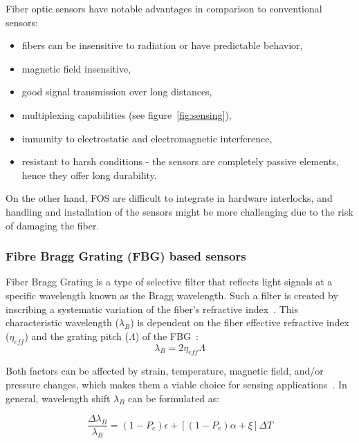 Fiber optic sensors have notable advantages in comparison to conventional sensors:

\begin{itemize}
    \item fibers can be insensitive to radiation or have predictable behavior,
    \item magnetic field insensitive,
    \item good signal transmission over long distances,
    \item multiplexing capabilities (see figure~\ref{fig:sensing}),
    \item immunity to electrostatic and electromagnetic interference,
    \item resistant to harsh conditions - the sensors are completely passive elements, hence they offer long durability.
\end{itemize}

On the other hand, \gls{FOS} are difficult to integrate in hardware interlocks, and handling and installation of the sensors might be more challenging due to the risk of damaging the fiber.




\subsubsection{Fibre Bragg Grating (FBG) based sensors}
\label{fbg}
Fiber Bragg Grating is a type of selective filter that reflects light signals at a specific wavelength known as the Bragg wavelength. Such a filter is created by inscribing a systematic variation of the fiber's refractive index~\cite{fbg_overview}. This characteristic wavelength ($\lambda_{B}$) is dependent on the fiber effective refractive index ($\eta_{eff}$) and the grating pitch ($\Lambda$) of the \gls{FBG}~\cite{Othonos2000FiberBG}:
\begin{equation}
    \lambda_{B} = 2 \eta_{eff} \Lambda
\end{equation}

Both factors can be affected by strain, temperature, magnetic field, and/or pressure changes, which makes them a viable choice for sensing applications~\cite{Yun-Jiang_Rao_1997}. In general, wavelength shift $\lambda_{B}$ can be formulated as:

\begin{equation}
    \frac{\Delta\lambda_{B}}{\lambda_{B}}=(1-P_{e}) \epsilon + \left [(1-P_{e}) \alpha + \xi  \right ] \Delta T
\end{equation}

